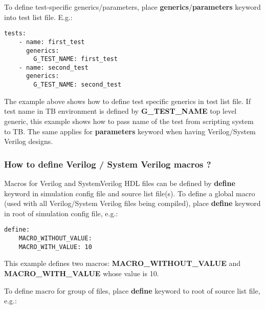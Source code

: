\documentclass{tropic_design_spec}
\begin{document}
\vspace{0.5cm}

To define test-specific generics/parameters, place \textbf{generics}/\textbf{parameters} keyword
into test  list file. E.g.:

\begin{lstlisting}
tests:
    - name: first_test
      generics:
        G_TEST_NAME: first_test
    - name: second_test
      generics:
        G_TEST_NAME: second_test
\end{lstlisting}

The example above shows how to define test specific generics in test list file. If
test name in TB environment is defined by \textbf{G_TEST_NAME} top level generic,
this example shows how to pass name of the test from scripting system to TB. The
same applies for \textbf{parameters} keyword when having Verilog/System Verilog designs.




\subsubsection{How to define Verilog / System Verilog macros ?}
\label{sec:how-to-define-verilog-system-verilog-macros}

Macros for Verilog and SystemVerilog HDL files can be defined by \textbf{define} keyword
in simulation config file and source list file(s). To define a global macro (used with
all Verilog/System Verilog files being compiled), place \textbf{define} keyword in root
of simulation config file, e.g.:

\begin{lstlisting}
define:
    MACRO_WITHOUT_VALUE:
    MACRO_WITH_VALUE: 10
\end{lstlisting}

This example defines two macros: \textbf{MACRO_WITHOUT_VALUE} and \textbf{MACRO_WITH_VALUE}
whose value is 10.

To define macro for group of files, place \textbf{define} keyword to root of source list file, e.g.:
\end{document}
